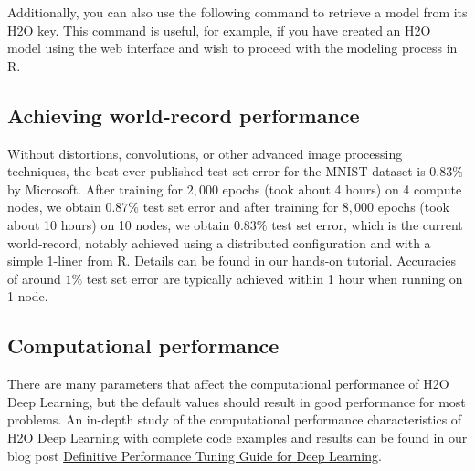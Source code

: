 \noindent
Additionally, you can also use the following command to retrieve a model from its H2O key. This command is useful, for example, if you have created an H2O model using the web interface and wish to proceed with the modeling process in R.

\waterExampleInR


\waterExampleInPython




\subsection{Achieving world-record performance}

Without distortions, convolutions, or other advanced image processing techniques, the best-ever published test set error for the MNIST dataset is $0.83$\% by Microsoft. After training for $2,000$ epochs (took about 4 hours) on 4 compute nodes, we obtain $0.87\%$ test set error and after training for $8,000$ epochs (took about 10 hours) on 10 nodes, we obtain $0.83\%$ test set error, which is the current world-record, notably achieved using a distributed configuration and with a simple 1-liner from R. Details can be found in our \href{http://learn.h2o.ai/content/hands-on_training/deep_learning.html}{hands-on tutorial}. Accuracies of around $1\%$ test set error are typically achieved within 1 hour when running on 1 node.

\subsection{Computational performance}
There are many parameters that affect the computational performance of H2O Deep Learning, but the default values should result in good performance for most problems. An in-depth study of the computational performance characteristics of H2O Deep Learning with complete code examples and results can be found in our blog post \href{http://h2o.ai/blog/2015/08/deep-learning-performance/}{Definitive Performance Tuning Guide for Deep Learning}.

